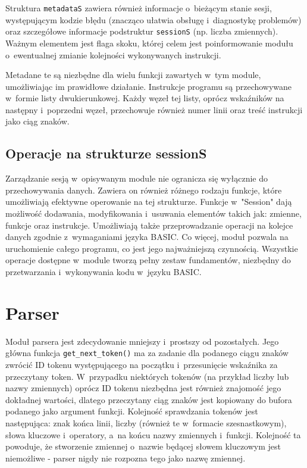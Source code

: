 \documentclass[shortabstract]{iithesis}
\begin{document}
Struktura \texttt{metadataS} zawiera również informacje o~bieżącym stanie sesji, występującym kodzie błędu (znacząco ułatwia obsługę i~diagnostykę problemów) oraz szczegółowe informacje podstruktur \texttt{sessionS} (np. liczba zmiennych). Ważnym elementem jest flaga skoku, której celem jest poinformowanie modułu o~ewentualnej zmianie kolejności wykonywanych instrukcji.

Metadane te są niezbędne dla wielu funkcji zawartych w~tym module, umożliwiając im prawidłowe działanie.
Instrukcje programu są przechowywane w~formie listy dwukierunkowej. Każdy węzeł tej listy, oprócz wskaźników na następny i~poprzedni węzeł, przechowuje również numer linii oraz treść instrukcji jako ciąg znaków.
\subsection{Operacje na strukturze sessionS}
Zarządzanie sesją w~opisywanym module nie ogranicza się wyłącznie do przechowywania danych. Zawiera on również różnego rodzaju funkcje, które umożliwiają efektywne operowanie na tej strukturze. Funkcje w~"Session" dają możliwość dodawania, modyfikowania i~usuwania elementów takich jak: zmienne, funkcje oraz instrukcje. Umożliwiają także przeprowadzanie operacji na kolejce danych zgodnie z~wymaganiami języka BASIC. Co więcej, moduł pozwala na uruchomienie całego programu, co jest jego najważniejszą czynnością. Wszystkie operacje dostępne w~module tworzą pełny zestaw fundamentów, niezbędny do przetwarzania i~wykonywania kodu w~języku BASIC.

\section{Parser}
Moduł parsera jest zdecydowanie mniejszy i~prostszy od pozostałych. Jego główna funkcja \texttt{get\_next\_token()} ma za zadanie dla podanego ciągu znaków zwrócić ID tokenu występującego na początku i~przesunięcie wskaźnika za przeczytany token. W~przypadku niektórych tokenów (na przykład liczby lub nazwy zmiennych) oprócz ID  tokenu niezbędna jest również znajomość jego dokładnej wartości, dlatego przeczytany ciąg znaków jest kopiowany do bufora podanego jako argument funkcji. Kolejność sprawdzania tokenów jest następująca: znak końca linii, liczby (również te w~formacie szesnastkowym), słowa kluczowe i~operatory, a~na końcu nazwy zmiennych i~funkcji. Kolejność ta powoduje, że stworzenie zmiennej o~nazwie będącej słowem kluczowym jest niemożliwe - parser nigdy nie rozpozna tego jako nazwę zmiennej.
\end{document}
